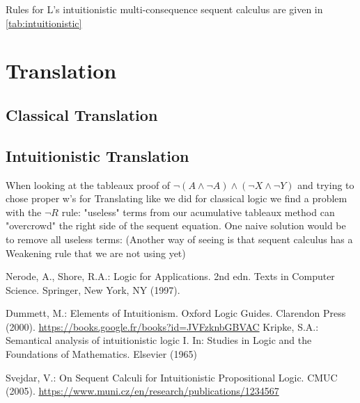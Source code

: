 \documentclass[runningheads]{llncs}
\begin{document}
\developmentSequentIntuitionisticDefinition

Rules for L's intuitionistic multi-consequence sequent calculus are given in \ref{tab:intuitionistic}


\RulesIntuitionisticSequentCalculus


\section{Translation}

\nodeTranslationFunction

\uselessTheorem

\subsection{Classical Translation}



\localTranslationValidityTheorem
    


\TranslationClassical

\TranslationClassicalProof



\subsection{Intuitionistic Translation}
When looking at the tableaux proof of $\neg (A \land \neg A) \land (\neg X \land \neg Y)$ and trying to chose 
proper w's for Translating like we did for classical logic we find a problem with the $\neg R$ rule:
"useless" terms from our acumulative tableaux method can "overcrowd" the right side of the sequent equation. One naive solution would be 
to remove all useless terms: (Another way of seeing is that sequent calculus has a Weakening rule that we are not using yet) 
\ThinningFunctionDefinition
\nFProof

%
%
%
% 
% 
%
\begin{thebibliography}{8}

    Nerode, A., Shore, R.A.: Logic for Applications. 2nd edn. Texts in Computer Science. Springer, New York, NY (1997). 
    
    Dummett, M.: Elements of Intuitionism. Oxford Logic Guides. Clarendon Press (2000). \url{https://books.google.fr/books?id=JVFzknbGBVAC}
    Kripke, S.A.: Semantical analysis of intuitionistic logic I. In: Studies in Logic and the Foundations of Mathematics. Elsevier (1965)


    Svejdar, V.: On Sequent Calculi for Intuitionistic Propositional Logic. CMUC (2005). \url{https://www.muni.cz/en/research/publications/1234567}


\end{thebibliography}
\end{document}
